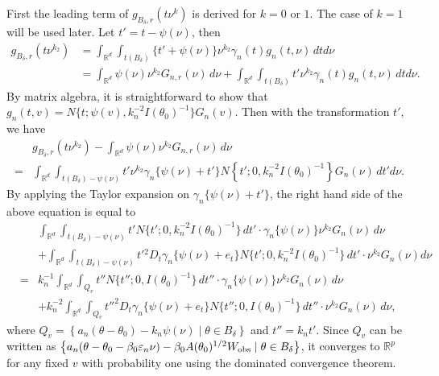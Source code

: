 \documentclass[9pt]{article}
\theoremstyle{remark}
\newcommand{\ST}[1]{{\color{blue}{#1}}}
\begin{document}
	First the leading term of $g_{B_{\delta},r}(t\nu^{k})$ is derived
	for $k=0$ or $1$. The case of $k=1$ will be used later. Let $t'=t-\psi(\nu)$,
	then 
	\begin{align*}
	g_{B_{\delta},r}(t\nu^{k_{2}}) & =\int_{\mathbb{R}^{d}}\int_{t(B_{\delta})}\{t'+\psi(\nu)\}\nu^{k_{2}}\gamma_{n}(t)g_{n}(t,\nu)\,dtd\nu\\
	& =\int_{\mathbb{R}^{d}}\psi(\nu)\nu^{k_{2}}G_{n,r}(\nu)\,d\nu+\int_{\mathbb{R}^{d}}\int_{t(B_{\delta})}t'\nu^{k_{2}}\gamma_{n}(t)g_{n}(t,\nu)\,dtd\nu.
	\end{align*}
	By matrix algebra, it is straightforward to show that $g_{n}(t,v)=N\{t;\psi(v),k_{n}^{-2}I(\theta_{0})^{-1}\}G_{n}(v)$.
	Then with the transformation $t'$, we have
	\begin{align*}
	& g_{B_{\delta},r}(t\nu^{k_{2}})-\int_{\mathbb{R}^{d}}\psi(\nu)\nu^{k_{2}}G_{n,r}(\nu)\,d\nu\\
	= & \int_{\mathbb{R}^{d}}\int_{t(B_{\delta})-\psi(\nu)}t'\nu^{k_{2}}\gamma_{n}\{\psi(\nu)+t'\}N\left\{ t';0,k_{n}^{-2}I(\theta_{0})^{-1}\right\} G_{n}(\nu)\,dt'd\nu.
	\end{align*}
	By applying the Taylor expansion on $\gamma_{n}\{\psi(\nu)+t'\}$,
	the right hand side of the above equation is equal to 
	\begin{eqnarray}
	&  & \int_{\mathbb{R}^{d}}\int_{t(B_{\delta})-\psi(\nu)}t'N\{t';0,k_{n}^{-2}I(\theta_{0})^{-1}\}\,dt'\cdot\gamma_{n}\{\psi(\nu)\}\nu^{k_{2}}G_{n}(\nu)\,d\nu\nonumber \\
	&  & +\int_{\mathbb{R}^{d}}\int_{t(B_{\delta})-\psi(\nu)}t'{}^{2}D_{t}\gamma_{n}\{\psi(\nu)+e_{t}\}N\{t';0,k_{n}^{-2}I(\theta_{0})^{-1}\}\,dt'\cdot\nu^{k_{2}}G_{n}(\nu)d\nu\nonumber \\
	& = & k_{n}^{-1}\int_{\mathbb{R}^{d}}\int_{Q_{v}}t''N\{t'';0,I(\theta_{0})^{-1}\}\,dt''\cdot\gamma_{n}\{\psi(\nu)\}\nu^{k_{2}}G_{n}(\nu)\,d\nu\nonumber \\
	&  & +k_{n}^{-2}\int_{\mathbb{R}^{d}}\int_{Q_{v}}t''^{2}D_{t}\gamma_{n}\{\psi(\nu)+e_{t}\}N\{t'';0,I(\theta_{0})^{-1}\}\,dt''\cdot\nu^{k_{2}}G_{n}(\nu)\,d\nu,\label{eq5}
	\end{eqnarray}
	where $Q_{v}=\left\{ a_{n}(\theta-\theta_{0})-k_{n}\psi(\nu)\mid\theta\in B_{\delta}\right\} $
	and $t''=k_{n}t'$. 
	Since $Q_{v}$ can be written as $\left\{ a_{n}(\theta-\theta_{0}-\beta_{0}\varepsilon_{n}\nu)-\beta_{0}A(\theta_{0})^{1/2}W_{\rm obs}\mid\theta\in B_{\delta}\right\} $,
	it converges to $\mathbb{R}^{p}$ for any fixed $v$ with probability one using the dominated convergence theorem. %
\end{document}
